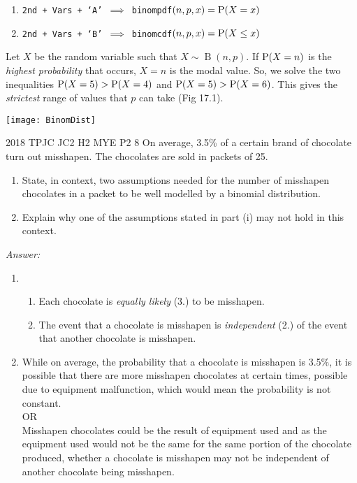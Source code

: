 \documentclass[oneside]{book}
\begin{document}
\begin{GCSkills}{}
  \begin{enumerate}
    \item \texttt{2nd + Vars + `A' \(\implies\) binompdf\((n,p,x)=\operatorname{P}(X=x)\)}
    \item \texttt{2nd + Vars + `B' \(\implies\) binomcdf\((n,p,x)=\operatorname{P}(X\leq x)\)}
  \end{enumerate}
\end{GCSkills}
\begin{note}
  Let \(X\) be the random variable such that \(X \sim \operatorname{B}(n,p)\). If \(\operatorname{P}(X=n)\) is the \emph{highest probability} that occurs, \(X=n\) is the modal value. So, we solve the two inequalities \(\operatorname{P}(X=5)>\operatorname{P}(X=4)\) and \(\operatorname{P}(X=5)>\operatorname{P}(X=6)\). This gives the \emph{strictest} range of values that \(p\) can take (Fig 17.1).
\end{note}
\begin{center}
  \texttt{[image: BinomDist]}
\end{center}
\begin{example}{2018 TPJC JC2 H2 MYE P2 8}{}
  On average, 3.5\% of a certain brand of chocolate turn out misshapen. The chocolates are sold in packets of 25.
  \begin{enumerate}[label=(\roman*)]
    \item State, in context, two assumptions needed for the number of misshapen chocolates in a packet to be well modelled by a binomial distribution.
    \item Explain why one of the assumptions stated in part (i) may not hold in this context.
  \end{enumerate}
  \textit{Answer:}
  \begin{enumerate}[label=(\roman*)]
    \item 
    \begin{enumerate}[label=\arabic*.]
      \item Each chocolate is \emph{equally likely} (3.) to be misshapen.
      \item The event that a chocolate is misshapen is \emph{independent} (2.) of the event that another chocolate is misshapen.
    \end{enumerate}
    \item While on average, the probability that a chocolate is misshapen is 3.5\%, it is possible that there are more misshapen chocolates at certain times, possible due to equipment malfunction, which would mean the probability is not constant.\\[3mm]
    OR\\[3mm]
    Misshapen chocolates could be the result of equipment used and as the equipment used would not be the same for the same portion of the chocolate produced, whether a chocolate is misshapen may not be independent of another chocolate being misshapen.
  \end{enumerate}
\end{example}




\end{document}
